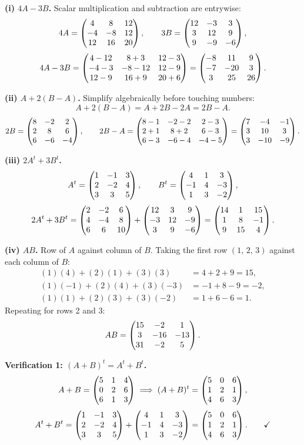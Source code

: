 \begin{solution}
\textbf{(i) $4A-3B$.} Scalar multiplication and subtraction are entrywise:
\[
4A=\begin{pmatrix}4&8&12\\-4&-8&12\\12&16&20\end{pmatrix},\qquad
3B=\begin{pmatrix}12&-3&3\\3&12&9\\9&-9&-6\end{pmatrix},
\]
\[
4A-3B=\begin{pmatrix}4-12&8+3&12-3\\-4-3&-8-12&12-9\\12-9&16+9&20+6\end{pmatrix}
=\begin{pmatrix}-8&11&9\\-7&-20&3\\3&25&26\end{pmatrix}.
\]

\medskip
\textbf{(ii) $A+2(B-A)$.} Simplify algebraically before touching numbers:
\[
A+2(B-A)=A+2B-2A=2B-A .
\]
\[
2B=\begin{pmatrix}8&-2&2\\2&8&6\\6&-6&-4\end{pmatrix},\qquad
2B-A=\begin{pmatrix}8-1&-2-2&2-3\\2+1&8+2&6-3\\6-3&-6-4&-4-5\end{pmatrix}
=\begin{pmatrix}7&-4&-1\\3&10&3\\3&-10&-9\end{pmatrix}.
\]

\medskip
\textbf{(iii) $2A^{t}+3B^{t}$.}
\[
A^{t}=\begin{pmatrix}1&-1&3\\2&-2&4\\3&3&5\end{pmatrix},\qquad
B^{t}=\begin{pmatrix}4&1&3\\-1&4&-3\\1&3&-2\end{pmatrix},
\]
\[
2A^{t}+3B^{t}
=\begin{pmatrix}2&-2&6\\4&-4&8\\6&6&10\end{pmatrix}+\begin{pmatrix}12&3&9\\-3&12&-9\\3&9&-6\end{pmatrix}
=\begin{pmatrix}14&1&15\\1&8&-1\\9&15&4\end{pmatrix}.
\]

\medskip
\textbf{(iv) $AB$.} Row of $A$ against column of $B$. Taking the first row
$(1,\,2,\,3)$ against each column of $B$:
\[
\begin{aligned}
(1)(4)+(2)(1)+(3)(3)&=4+2+9=15,\\
(1)(-1)+(2)(4)+(3)(-3)&=-1+8-9=-2,\\
(1)(1)+(2)(3)+(3)(-2)&=1+6-6=1 .
\end{aligned}
\]
Repeating for rows 2 and 3:
\[
AB=\begin{pmatrix}15&-2&1\\3&-16&-13\\31&-2&5\end{pmatrix}.
\]

\medskip
\textbf{Verification 1: $(A+B)^{t}=A^{t}+B^{t}$.}
\[
A+B=\begin{pmatrix}5&1&4\\0&2&6\\6&1&3\end{pmatrix}
\;\Longrightarrow\;
(A+B)^{t}=\begin{pmatrix}5&0&6\\1&2&1\\4&6&3\end{pmatrix},
\]
\[
A^{t}+B^{t}=\begin{pmatrix}1&-1&3\\2&-2&4\\3&3&5\end{pmatrix}+\begin{pmatrix}4&1&3\\-1&4&-3\\1&3&-2\end{pmatrix}
=\begin{pmatrix}5&0&6\\1&2&1\\4&6&3\end{pmatrix}. \qquad\checkmark
\]


\end{solution}
